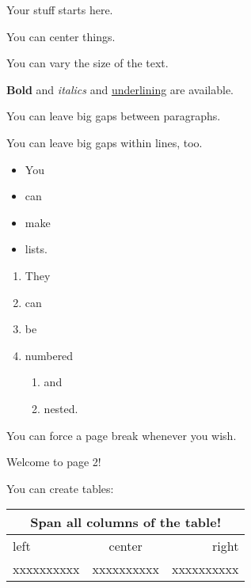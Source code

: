 \documentclass{article}         %
\begin{document}
\pagestyle{plain}               %

Your stuff starts here.

\begin{center}
You can center things.
\end{center}

You can {\small vary} the {\large size} of the text.

\textbf{Bold} and \textit{italics} and \underline{underlining} are available.

\vspace*{2cm}

You can leave big gaps between paragraphs.

You can leave big \hspace*{2.0cm} gaps within lines, too.


\begin{itemize}
\item You
\item can
\item make
\item lists.
\end{itemize}

\begin{enumerate}
\item They
\item can
\item be
\item numbered

  \begin{enumerate} 
  \item and
  \item nested.
  \end{enumerate}

\end{enumerate}

You can force a page break whenever you wish.

\newpage

Welcome to page 2!

You can create tables:

\begin{tabular}{|l|c|r|}
\multicolumn{3}{c}{Span all columns of the table!} \\
\hline
left & center & right \\
xxxxxxxxxx & xxxxxxxxxx & xxxxxxxxxx \\
\hline
\end{tabular}
\end{document}
